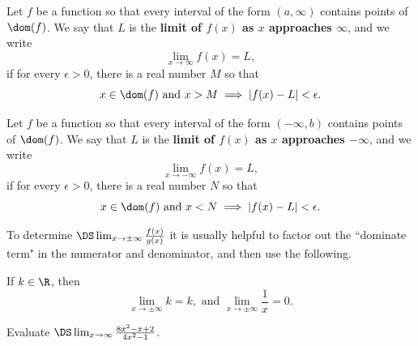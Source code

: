 \setcounter{chapter}{2}
\setcounter{section}{6}
\setcounter{theorem}{0}
\setcounter{equation}{0}


\begin{definition}
Let $f$ be a function so that every interval of the form $(a,\infty)$ contains points of $\dom(f)$.
We say that $L$ is the \textbf{limit of $f(x)$ as $x$ approaches $\infty$}, and we write
\begin{equation*}
\lim_{x\to\infty}f(x) = L,
\end{equation*}
if for every $\epsilon>0$, there is a real number $M$ so that 
\begin{equation*}
x\in\dom(f)\text{ and }x>M\implies |f(x)-L|<\epsilon.
\end{equation*}
\end{definition}

\begin{definition}
Let $f$ be a function so that every interval of the form $(-\infty,b)$ contains points of $\dom(f)$.
We say that $L$ is the \textbf{limit of $f(x)$ as $x$ approaches $-\infty$}, and we write
\begin{equation*}
\lim_{x\to -\infty}f(x) = L,
\end{equation*}
if for every $\epsilon>0$, there is a real number $N$ so that 
\begin{equation*}
x\in\dom(f)\text{ and }x<N\implies |f(x)-L|<\epsilon.
\end{equation*}
\end{definition}

\begin{remark}
To determine $\DS\lim_{x\to\pm\infty}\frac{f(x)}{g(x)}$ it is usually helpful to factor out the ``dominate term" in the numerator and denominator, and then use the following.
\end{remark}

\begin{theorem}
If $k\in\R$, then
\begin{equation*}
\lim_{x\to\pm\infty} k =k,\text{ and }\lim_{x\to\pm\infty}\frac{1}{x} = 0.
\end{equation*}
\end{theorem}

\begin{example}
Evaluate $\DS\lim_{x\to\infty}\frac{8x^2-x+2}{4x^2-1}$.

\end{example}

